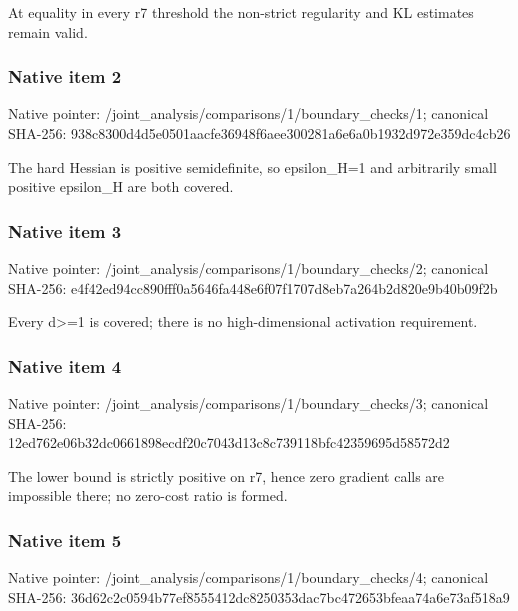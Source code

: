 \documentclass[10pt,a4paper]{article}
\begin{document}
\begingroup\raggedright\sloppy At equality in every r7 threshold the non-strict regularity and KL estimates remain valid.\par\endgroup

\subsubsection{Native item 2}
Native pointer: /joint\_\allowbreak{}analysis/comparisons/1/boundary\_\allowbreak{}checks/1; canonical SHA-256: 938c8300d4d5e0501aacfe36948f6aee300281a6e6a0b1932d972e359dc4cb26

\begingroup\raggedright\sloppy The hard Hessian is positive semidefinite,\allowbreak{} so epsilon\_\allowbreak{}H=\allowbreak{}1 and arbitrarily small positive epsilon\_\allowbreak{}H are both covered.\par\endgroup

\subsubsection{Native item 3}
Native pointer: /joint\_\allowbreak{}analysis/comparisons/1/boundary\_\allowbreak{}checks/2; canonical SHA-256: e4f42ed94cc890fff0a5646fa448e6f07f1707d8eb7a264b2d820e9b40b09f2b

\begingroup\raggedright\sloppy Every d>=\allowbreak{}1 is covered;\allowbreak{} there is no high-dimensional activation requirement.\par\endgroup

\subsubsection{Native item 4}
Native pointer: /joint\_\allowbreak{}analysis/comparisons/1/boundary\_\allowbreak{}checks/3; canonical SHA-256: 12ed762e06b32dc0661898ecdf20c7043d13c8c739118bfc42359695d58572d2

\begingroup\raggedright\sloppy The lower bound is strictly positive on r7,\allowbreak{} hence zero gradient calls are impossible there;\allowbreak{} no zero-cost ratio is formed.\par\endgroup

\subsubsection{Native item 5}
Native pointer: /joint\_\allowbreak{}analysis/comparisons/1/boundary\_\allowbreak{}checks/4; canonical SHA-256: 36d62c2c0594b77ef8555412dc8250353dac7bc472653bfeaa74a6e73af518a9
\end{document}
